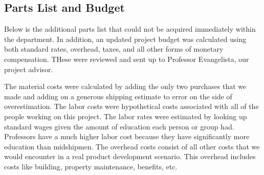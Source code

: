\documentclass[10pt]{article}
\begin{document}
\subsection{Parts List and Budget}
Below is the additional parts list that could not be acquired immediately within the department. In addition, an updated project budget was calculated using both standard rates, overhead, taxes, and all other forms of monetary compensation. THese were reviewed and sent up to Professor Evangelista, our project advisor. 
%
%
%
%
%
%
%
%
%
%
%
%
%
%
%
%
%
%
%
%
%
%
%
%
%
%
%
%
%
%
%
%
%
%
%
%
%
%
%
%
%
%
%
%
%
%
%
%
%
%
%
%
%
%
%
%
%
%
%
%
%
%
%
%
%
%
%
%
%
%
%
%
%
%
%
%
%
%
%
%
%
%
%
%
%
%
%
%
%
%
%
%
%
%
%
%
%
%
%
%
%
%
%
%
%
%
%
%
%
%
%
%
%
%
%
%
%
%
%
%
%
%
%
%
%
%
%
%
%
%
%
%
%
%
%
%
%
%
%
%
%
%
%
%
%
%
%
%
%
%
%

The material costs were calculated  by adding the only two purchases that we made and adding on a generous shipping estimate to error on the side of overestimation.  The labor costs were hypothetical costs associated with all of the people working on this project.  The labor rates were estimated by looking up standard wages given the amount of education each person or group had.  Professors have a much higher labor cost because they have significantly more education than midshipmen.  The overhead costs consist of all other costs that we would encounter in a real product development scenario.  This overhead includes costs like building, property maintenance, benefits, etc.  
\end{document}
